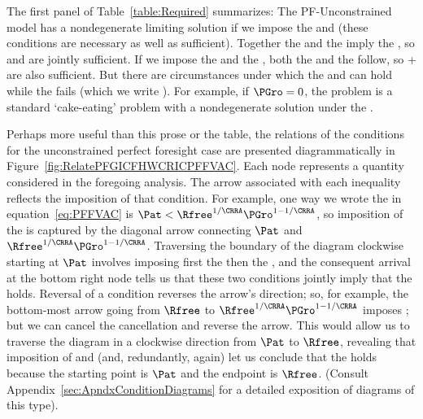\documentclass[BufferStockTheory]{subfiles}
\begin{document}
The first panel of Table~\ref{table:Required} summarizes: The PF-Unconstrained model has a nondegenerate limiting solution if we impose the {\RIC} and {\FHWC} (these conditions are necessary as well as sufficient).  Together the {\PFFVAC} and the {\FHWC} imply the {\RIC}, so {\PFFVAC} and {\FHWC} are jointly sufficient.  If we impose the {\GIC} and the {\FHWC}, both the {\PFFVAC} and the {\RIC} follow, so {\GIC}+{\FHWC} are also sufficient.  But there are circumstances under which the {\RIC} and {\FHWC} can hold while the {\PFFVAC} fails (which we write \cncl{\PFFVAC}).  For example, if $\PGro=0$, the problem is a standard `cake-eating' problem with a nondegenerate solution under the {\RIC}.%

Perhaps more useful than this prose or the table,  the relations of the conditions for the unconstrained perfect foresight case are presented diagrammatically in Figure~\ref{fig:RelatePFGICFHWCRICPFFVAC}.  Each node represents a quantity considered in the foregoing analysis.  The arrow associated with each inequality reflects the imposition of that condition.  For example, one way we wrote the {\PFFVAC} in equation~\eqref{eq:PFFVAC} is $\Pat < \Rfree^{1/\CRRA} \PGro^{1-1/\CRRA}$, so imposition of the {\PFFVAC} is captured by the diagonal arrow connecting $\Pat$ and $\Rfree^{1/\CRRA}\PGro^{1-1/\CRRA}$.  Traversing the boundary of the diagram clockwise starting at $\Pat$ involves imposing first the {\GICRaw} then the {\FHWC}, and the consequent arrival at the bottom right node tells us that these two conditions jointly imply that the {\PFFVAC} holds.  Reversal of a condition reverses the arrow's direction; so, for example, the bottom-most arrow going from $\Rfree$ to $\Rfree^{1/\CRRA}\PGro^{1-1/\CRRA}$ imposes {\cncl{\FHWC}}; but we can cancel the cancellation and reverse the arrow.  This would allow us to traverse the diagram in a clockwise direction from $\Pat$ to $\Rfree$, revealing that imposition of {\GICRaw} and {\FHWC} (and, redundantly, {\FHWC} again) let us conclude that the {\RIC} holds because the starting point is $\Pat$ and the endpoint is $\Rfree$.  (Consult Appendix~\ref{sec:ApndxConditionDiagrams} for a detailed exposition of diagrams of this type).

\providecommand{\figName}{RelatePFGICFHWCRICPFFVAC} %
\providecommand{\figFile}{\figName} %
\hypertarget{\figName}{}
\end{document}
